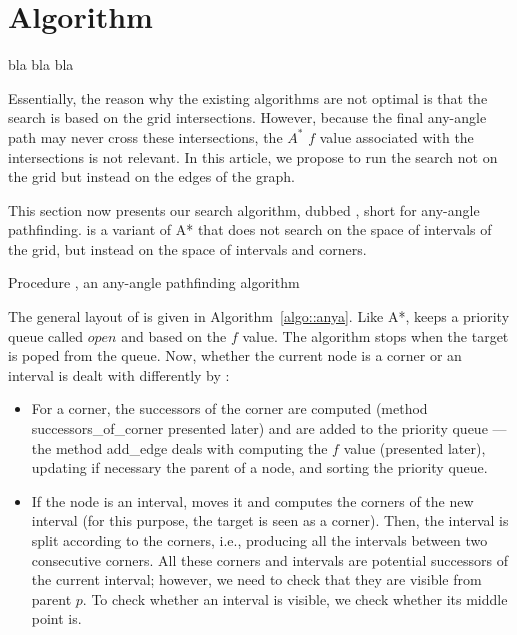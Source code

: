 \section{Algorithm}
bla bla bla

Essentially, the reason why the existing algorithms are not optimal
is that the search is based on the grid intersections.  
However, because the final any-angle path 
may never cross these intersections, 
the $A^*$ $f$ value associated with the intersections
is not relevant.  
In this article, we propose to run the search not on the grid 
but instead on the edges of the graph.  

This section now presents our search algorithm, dubbed \anya, short for
any-angle pathfinding.  \anya{} is a variant of A* that does not search on the
space of intervals of the grid, but instead on the space of intervals and
corners.

\begin{algorithm}[ht!]
  
  \caption{Procedure \anya, an any-angle pathfinding algorithm}
  \label{algo::anya}
\end{algorithm}

The general layout of \anya{} is given in Algorithm~\ref{algo::anya}.  
Like A*, \anya{} keeps a priority queue called $open$ 
and based on the $f$ value.  
The algorithm stops when the target is poped from the queue.  
Now, whether the current node is a corner or an interval 
is dealt with differently by \anya: 
\begin{itemize}
\item 
  For a corner, the successors of the corner are computed 
  (method successors\_of\_corner presented later) 
  and are added to the priority queue --- 
  the method add\_edge deals with computing the $f$ value 
  (presented later), updating if necessary the parent of a node, 
  and sorting the priority queue.  
\item 
  If the node is an interval, \anya{} moves it 
  and computes the corners of the new interval 
  (for this purpose, the target is seen as a corner).  
  Then, the interval is split according to the corners, 
  i.e., producing all the intervals between two consecutive corners.  
  All these corners and intervals 
  are potential successors of the current interval; 
  however, we need to check that they are visible from parent $p$.  
  To check whether an interval is visible, 
  we check whether its middle point is.  
\end{itemize}

